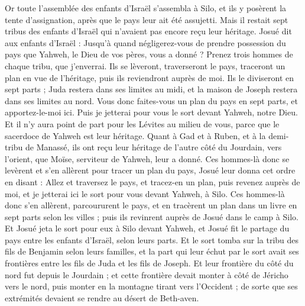 \begin{multicols}{2}
\VerseOne{}Or toute l'assemblée des enfants d'Israël s'assembla à Silo, et ils y posèrent la tente d'assignation, après que le pays leur ait été assujetti. 
Mais il restait sept tribus des enfants d'Israël qui n'avaient pas encore reçu leur héritage.
Josué dit aux enfants d'Israël : Jusqu'à quand négligerez-vous de prendre possession du pays que Yahweh, le Dieu de vos pères, vous a donné ?
Prenez trois hommes de chaque tribu, que j'enverrai. Ils se lèveront, traverseront le pays, traceront un plan en vue de l'héritage, puis ils reviendront auprès de moi.
Ils le diviseront en sept parts ; Juda restera dans ses limites au midi, et la maison de Joseph restera dans ses limites au nord.
Vous donc faites-vous un plan du pays en sept parts, et apportez-le-moi ici. Puis je jetterai pour vous le sort devant Yahweh, notre Dieu.
Et il n'y aura point de part pour les Lévites au milieu de vous, parce que le sacerdoce de Yahweh est leur héritage. Quant à Gad et à Ruben, et à la demi-tribu de Manassé, ils ont reçu leur héritage de l'autre côté du Jourdain, vers l'orient, que Moïse, serviteur de Yahweh, leur a donné.
Ces hommes-là donc se levèrent et s'en allèrent pour tracer un plan du pays, Josué leur donna cet ordre en disant : Allez et traversez le pays, et tracez-en un plan, puis revenez auprès de moi, et je jetterai ici le sort pour vous devant Yahweh, à Silo.
Ces hommes-là donc s'en allèrent, parcoururent le pays, et en tracèrent un plan dans un livre en sept parts selon les villes ; puis ils revinrent auprès de Josué dans le camp à Silo.
Et Josué jeta le sort pour eux à Silo devant Yahweh, et Josué fit le partage du pays entre les enfants d'Israël, selon leurs parts.
Et le sort tomba sur la tribu des fils de Benjamin selon leurs familles, et la part qui leur échut par le sort avait ses frontières entre les fils de Juda et les fils de Joseph.
Et leur frontière du côté du nord fut depuis le Jourdain ; et cette frontière devait monter à côté de Jéricho vers le nord, puis monter en la montagne tirant vers l'Occident ; de sorte que ses extrémités devaient se rendre au désert de Beth-aven. 

\end{multicols}
